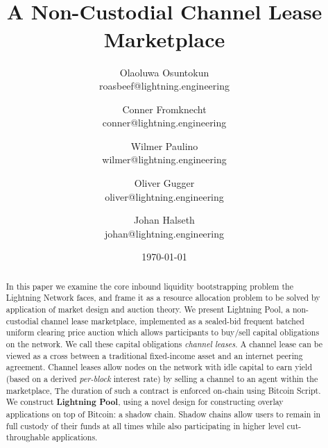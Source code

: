 \documentclass[12pt,a4paper]{article}
\theoremstyle{definition}
\begin{document}
\title{\texttt{} \\
    A Non-Custodial Channel Lease Marketplace}
\author{
    Olaoluwa Osuntokun \\
    \small{roasbeef@lightning.engineering}
    \and
    Conner Fromknecht \\
    \small{conner@lightning.engineering}
     \and
     Wilmer Paulino  \\
    \small{wilmer@lightning.engineering}
     \and
     Oliver Gugger \\
    \small{oliver@lightning.engineering}
     \and
     Johan Halseth \\
    \small{johan@lightning.engineering}
}

\date{\today}
\maketitle

\begin{abstract}


In this paper we examine the core inbound liquidity bootstrapping problem the
Lightning Network faces, and frame it as a resource allocation problem to be
solved by application of market design and auction theory. We present Lightning
Pool, a non-custodial channel lease marketplace, implemented as a sealed-bid
frequent batched uniform clearing price auction which allows participants to
buy/sell capital obligations on the network. We call these capital obligations
\emph{channel leases}. A channel lease can be viewed as a cross between a
traditional fixed-income asset and an internet peering agreement. Channel
leases allow nodes on the network with idle capital to earn yield (based on a
derived \emph{per-block} interest rate) by selling a channel to an agent within
the marketplace, The duration of such a contract is enforced on-chain using
Bitcoin Script. We construct \textbf{Lightning Pool}, using a novel design for
constructing overlay applications on top of Bitcoin: a shadow chain. Shadow
chains allow users to remain in full custody of their funds at all times while
also participating in higher level cut-throughable applications.

\end{abstract}
\end{document}
